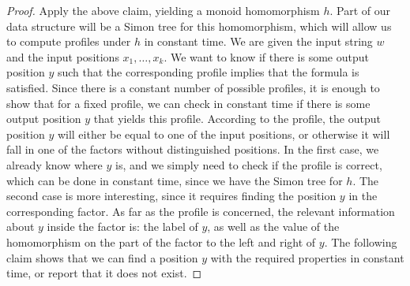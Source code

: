 \begin{proof}
Apply the above claim, yielding a monoid homomorphism $h$. Part of our data structure will be a Simon tree for this homomorphism, which will allow us to compute profiles under $h$ in constant time. 
 We are given the input string $w$ and the input positions $x_1,\ldots,x_k$. We want to know if there is some output position $y$ such that the corresponding profile implies that the formula is satisfied. Since there is a constant number of possible profiles, it is enough to show that for a fixed profile, we can check in constant time if there is some output position $y$ that yields this profile. According to the profile, the output position $y$ will either be equal to one of the input positions, or otherwise it will fall in one of the factors without distinguished positions. In the first case, we already know where $y$ is, and we simply need to check if the profile is correct, which can be done in constant time, since we have the Simon tree for $h$. The second case is more interesting, since it requires finding the position $y$ in the corresponding factor. As far as the profile is concerned, the relevant information about $y$ inside the factor is: the label of $y$, as well as  the value of the homomorphism on the part of the factor to the left and right of $y$. The following claim shows that we can find a position $y$  with the required properties in constant time, or report that it does not exist.


\end{proof}

